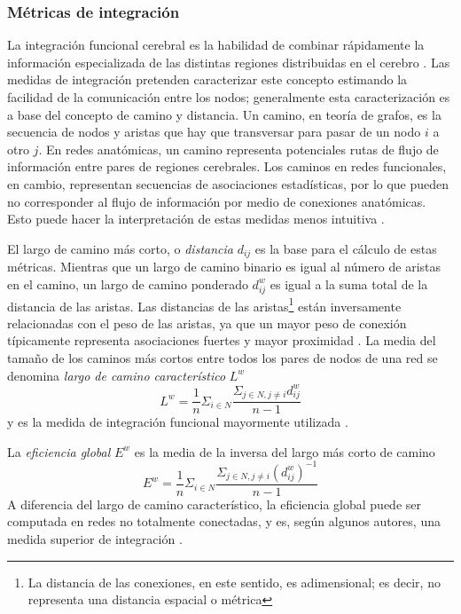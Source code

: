 \subsubsection{Métricas de integración}
La integración funcional cerebral es la habilidad de combinar rápidamente la información especializada de las distintas regiones distribuidas en el cerebro \parencite{Tononi1994}.
Las medidas de integración pretenden caracterizar este concepto estimando la facilidad de la comunicación entre los nodos; generalmente esta caracterización es a base del concepto de camino y distancia.
Un camino, en teoría de grafos, es la secuencia de nodos y aristas que hay que transversar para pasar de un nodo $i$ a otro $j$.
En redes anatómicas, un camino representa potenciales rutas de flujo de información entre pares de regiones cerebrales.
Los caminos en redes funcionales, en cambio, representan secuencias de asociaciones estadísticas, por lo que pueden no corresponder al flujo de información por medio de conexiones anatómicas. Esto puede hacer la interpretación de estas medidas menos intuitiva \parencite{Rubinov2010}. \par
El largo de camino más corto, o \emph{distancia} $d_{ij}$ es la base para el cálculo de estas métricas.
Mientras que un largo de camino binario es igual al número de aristas en el camino, un largo de camino ponderado $d_{ij}^w$ es igual a la suma total de la distancia de las aristas.
Las distancias de las aristas\footnote{La distancia de las conexiones, en este sentido, es adimensional; es decir, no representa una distancia espacial o métrica} están inversamente relacionadas con el peso de las aristas, ya que un mayor peso de conexión típicamente representa asociaciones fuertes y mayor proximidad \parencite{Rubinov2010}.
La media del tamaño de los caminos más cortos entre todos los pares de nodos de una red se denomina \emph{largo de camino característico} $L^w$ \parencite{Watts1998}
\begin{equation}\label{eqCPL}
    L^w=\frac{1}{n}\Sigma_{i \in N}\frac{\Sigma_{j \in N,j\neq i}d_{ij}^w}{n-1}
\end{equation}
y es la medida de integración funcional mayormente utilizada \parencite{Rubinov2010}.\par
La \emph{eficiencia global} $E^w$ \parencite{Latora2001} es la media de la inversa del largo más corto de camino
\begin{equation}\label{eqEglob}
    E^w=\frac{1}{n}\Sigma_{i \in N}\frac{\Sigma_{j \in N, j \neq i}(d_{ij}^w)^{-1}}{n-1}
\end{equation}
A diferencia del largo de camino característico, la eficiencia global puede ser computada en redes no totalmente conectadas, y es, según algunos autores, una medida superior de integración \parencite{Achard2007}.

